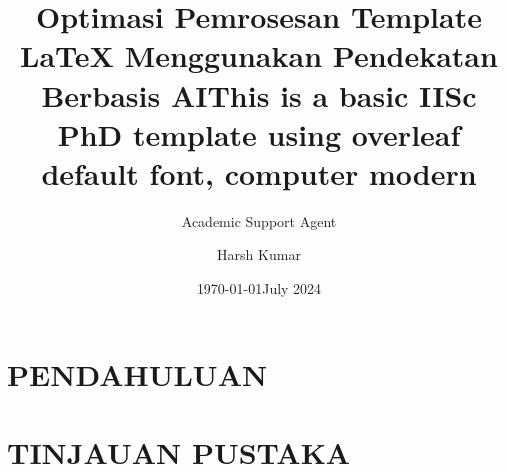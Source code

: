 \documentclass{report}
\title{Optimasi Pemrosesan Template LaTeX Menggunakan Pendekatan Berbasis AI}
\author{Academic Support Agent}
\date{\today}
\begin{document}
\maketitle

\begin{abstract}

\end{abstract}

\chapter{PENDAHULUAN}


\chapter{TINJAUAN PUSTAKA}



\usepackage{graphicx} %
\usepackage{subcaption} %
\usepackage[T1]{fontenc} %
\usepackage{lipsum}  %

\graphicspath{{images/}} %
\usepackage{amsmath}  %
\usepackage[margin=2.5cm]{geometry}  %
\usepackage{hyperref}   %
\usepackage{biblatex} %

\usepackage{fancyhdr}
\renewcommand{\chaptermark}[1]{\markboth{#1}{}}
\renewcommand{\sectionmark}[1]{\markright{#1}}

\title {This is a basic IISc PhD template using overleaf default font, computer modern}
\author{Harsh Kumar}
\date{July 2024}
\newcommand{\thesistitle}{Feel Free to Share and Modify: This is a basic IISc PhD template using overleaf default font}
\newcommand{\myname}{Harsh Kumar}
\newcommand{\thesisdate}{July 2024}
\end{document}
